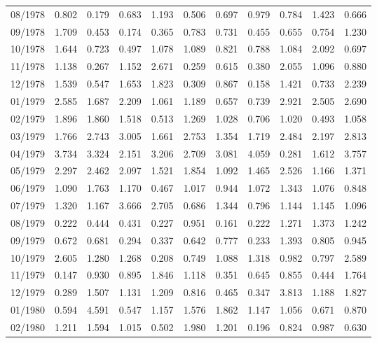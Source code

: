 \begin{tabular}{lrrrrrrrrrr}
08/1978 &  0.802 &  0.179 &  0.683 &  1.193 &  0.506 &  0.697 &  0.979 &  0.784 &  1.423 &  0.666 \\
09/1978 &  1.709 &  0.453 &  0.174 &  0.365 &  0.783 &  0.731 &  0.455 &  0.655 &  0.754 &  1.230 \\
10/1978 &  1.644 &  0.723 &  0.497 &  1.078 &  1.089 &  0.821 &  0.788 &  1.084 &  2.092 &  0.697 \\
11/1978 &  1.138 &  0.267 &  1.152 &  2.671 &  0.259 &  0.615 &  0.380 &  2.055 &  1.096 &  0.880 \\
12/1978 &  1.539 &  0.547 &  1.653 &  1.823 &  0.309 &  0.867 &  0.158 &  1.421 &  0.733 &  2.239 \\
01/1979 &  2.585 &  1.687 &  2.209 &  1.061 &  1.189 &  0.657 &  0.739 &  2.921 &  2.505 &  2.690 \\
02/1979 &  1.896 &  1.860 &  1.518 &  0.513 &  1.269 &  1.028 &  0.706 &  1.020 &  0.493 &  1.058 \\
03/1979 &  1.766 &  2.743 &  3.005 &  1.661 &  2.753 &  1.354 &  1.719 &  2.484 &  2.197 &  2.813 \\
04/1979 &  3.734 &  3.324 &  2.151 &  3.206 &  2.709 &  3.081 &  4.059 &  0.281 &  1.612 &  3.757 \\
05/1979 &  2.297 &  2.462 &  2.097 &  1.521 &  1.854 &  1.092 &  1.465 &  2.526 &  1.166 &  1.371 \\
06/1979 &  1.090 &  1.763 &  1.170 &  0.467 &  1.017 &  0.944 &  1.072 &  1.343 &  1.076 &  0.848 \\
07/1979 &  1.320 &  1.167 &  3.666 &  2.705 &  0.686 &  1.344 &  0.796 &  1.144 &  1.145 &  1.096 \\
08/1979 &  0.222 &  0.444 &  0.431 &  0.227 &  0.951 &  0.161 &  0.222 &  1.271 &  1.373 &  1.242 \\
09/1979 &  0.672 &  0.681 &  0.294 &  0.337 &  0.642 &  0.777 &  0.233 &  1.393 &  0.805 &  0.945 \\
10/1979 &  2.605 &  1.280 &  1.268 &  0.208 &  0.749 &  1.088 &  1.318 &  0.982 &  0.797 &  2.589 \\
11/1979 &  0.147 &  0.930 &  0.895 &  1.846 &  1.118 &  0.351 &  0.645 &  0.855 &  0.444 &  1.764 \\
12/1979 &  0.289 &  1.507 &  1.131 &  1.209 &  0.816 &  0.465 &  0.347 &  3.813 &  1.188 &  1.827 \\
01/1980 &  0.594 &  4.591 &  0.547 &  1.157 &  1.576 &  1.862 &  1.147 &  1.056 &  0.671 &  0.870 \\
02/1980 &  1.211 &  1.594 &  1.015 &  0.502 &  1.980 &  1.201 &  0.196 &  0.824 &  0.987 &  0.630 \\

\end{tabular}
